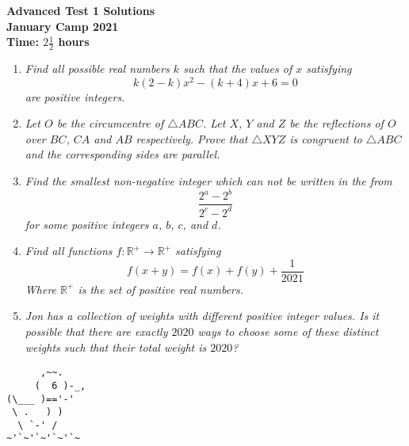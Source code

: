 \documentclass{article}
\begin{document}
\thispagestyle{empty}

\begin{center}
  \textbf{\Large Advanced Test 1 Solutions}
  \\ \vspace{1em}
  \textbf{\large January Camp 2021}
  \\ \vspace{1em}
  \textbf{\large Time: $2\frac{1}{2}$ hours}
\end{center}

\vspace{24pt}

\begin{enumerate}[1.]

\item %
\it{Find all possible real numbers $k$ such that the values of $x$ satisfying
$$k(2 - k)x^2 - (k + 4)x + 6 = 0$$
are positive integers.}


\item %
\it{Let $O$ be the circumcentre of $\triangle ABC$. Let $X$, $Y$ and $Z$ be the reflections of $O$ over $BC$, $CA$ and $AB$ respectively. Prove that $\triangle XYZ$ is congruent to $\triangle ABC$ and the corresponding sides are parallel.}


\item %
\it{Find the smallest non-negative integer which can not be written in the from
\[
  \frac{2^a - 2^b}{2^c - 2^d}
\]
for some positive integers $a$, $b$, $c$, and $d$.}


\item %
\it{Find all functions $f: \mathbb{R}^+ \rightarrow \mathbb{R}^+$ satisfying 
$$f(x + y) = f(x) + f(y) + \frac{1}{2021} $$
Where $\mathbb{R}^+$ is the set of positive real numbers. }

\item %
\it{Jon has a collection of weights with different positive integer values. Is it possible that there are exactly $2020$ ways to choose some of these distinct weights such that their total weight is $2020$?}

\end{enumerate}


\vfill
\centering
\begin{BVerbatim}
      ,~~.
     (  6 )-_,
(\___ )=='-'
 \ .   ) )
  \ `-' /    
~'`~'`~'`~'`~
\end{BVerbatim}
\end{document}
